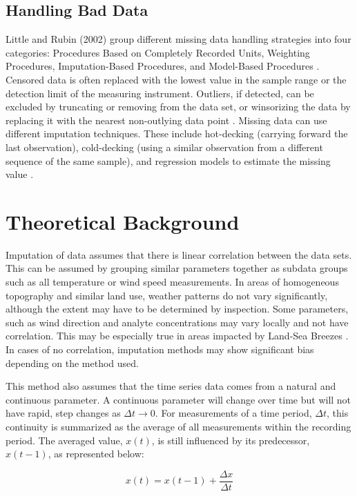 \documentclass[preprint,12pt,authoryear]{elsarticle}
\begin{document}
\begin{linenumbers}
\subsection{Handling Bad Data}

Little and Rubin (2002) group different missing data handling strategies into four categories: Procedures Based on Completely Recorded Units, Weighting Procedures, Imputation-Based Procedures, and Model-Based Procedures \citep{Little2002}. Censored data is often replaced with the lowest value in the sample range or the detection limit of the measuring instrument.
Outliers, if detected, can be excluded by truncating or removing from the data set, or winsorizing the data by replacing it with the nearest non-outlying data point \citep{Hastings1947}. Missing data can use different imputation techniques. These include hot-decking (carrying forward the last observation), cold-decking (using a similar observation from a different sequence of the same sample), and regression models to estimate the missing value \citep{Horton2007}.



\section{Theoretical Background}
Imputation of data assumes that there is linear correlation between the data sets. This can be assumed by grouping similar parameters together as subdata groups such as all temperature or wind speed measurements. In areas of homogeneous topography and similar land use, weather patterns do not vary significantly, although the extent may have to be determined by inspection. Some parameters, such as wind direction and analyte concentrations may vary locally and not have correlation. This may be especially true in areas impacted by Land-Sea Breezes \citep{Freeman2017}. In cases of no correlation, imputation methods may show significant bias depending on the method used.

This method also assumes that the time series data comes from a natural and continuous parameter. A continuous parameter will change over time but will not have rapid, step changes as $\Delta t \rightarrow 0$. For measurements of a time period,  $\Delta t$, this continuity is summarized as the average of all measurements within the recording period. The averaged value, $x(t)$, is still influenced by its predecessor, $x(t-1)$, as represented below:

\begin{equation}
\label{eq:time1}
x(t) = x(t-1) + \frac{\Delta x}{\Delta t}
\end{equation}


\end{linenumbers}
\end{document}
